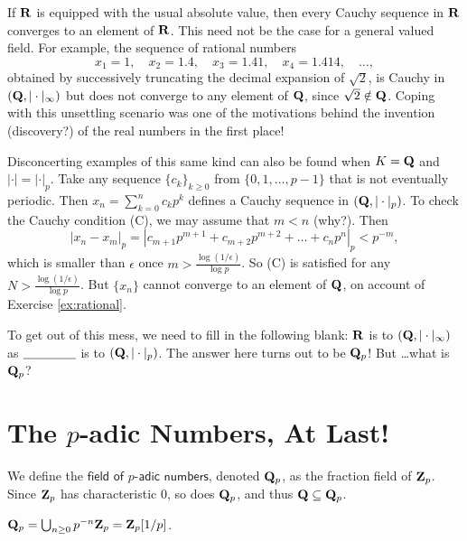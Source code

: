 \vspace{-0.22in}
\testrule 
If $\mathbf{R}$ is equipped with the usual absolute value, then every Cauchy sequence in $\mathbf{R}$ converges to an element of $\mathbf{R}$. This need not be the case for a general valued field. For example, the sequence of rational numbers
\[ x_1 =1, \quad x_2 = 1.4, \quad x_3 = 1.41, \quad x_4 = 1.414,\quad \dots, \]
obtained by successively truncating the decimal expansion of $\sqrt{2}$, is Cauchy in $(\mathbf{Q},|\cdot|_{\infty})$ but does not converge to any element of $\mathbf{Q}$, since $\sqrt{2}\notin \mathbf{Q}$. Coping with this unsettling scenario was one of the motivations behind the invention (discovery?) of the real numbers in the first place!

Disconcerting examples of this same kind can also be found when $K=\mathbf{Q}$ and $|\cdot| = |\cdot|_p$. Take any sequence $\{c_k\}_{k\ge 0}$ from $\{0,1,\dots,p-1\}$ that is not eventually periodic. Then $x_n = \sum_{k=0}^{n} c_k p^k$ defines a Cauchy sequence in $(\mathbf{Q},|\cdot|_p)$. To check the Cauchy condition (C), we may assume that $m < n$ (why?). Then  
\[ |x_n - x_m|_p = |c_{m+1} p^{m+1} + c_{m+2} p^{m+2} + \dots + c_n p^{n}|_p < p^{-m},\]
which is smaller than $\epsilon$ once $m > \frac{\log(1/\epsilon)}{\log{p}}$. So (C) is satisfied for any $N > \frac{\log(1/\epsilon)}{\log{p}}$. But $\{x_n\}$ cannot converge to an element of $\mathbf{Q}$, on account of Exercise \ref{ex:rational}.

To get out of this mess, we need to fill in the following blank: $\mathbf{R}$ is to $(\mathbf{Q},|\cdot|_{\infty})$ as $\underline{\hphantom{nonsense}}$ is to $(\mathbf{Q},|\cdot|_{p})$. The answer here turns out to be $\mathbf{Q}_p$! But \dots what is $\mathbf{Q}_p$?
\testruletwo

\section*{The $p$-adic Numbers, At Last!}

We define the $\textsf{field of $p$-adic numbers}$, denoted $\mathbf{Q}_p$,  as the fraction field of  $\mathbf{Z}_p$. Since $\mathbf{Z}_p$ has characteristic $0$, so does $\mathbf{Q}_p$, and thus $\mathbf{Q}\subseteq \mathbf{Q}_p$.

\begin{prob}\label{prob:63} $\mathbf{Q}_p = \bigcup_{n\ge 0} p^{-n} \mathbf{Z}_p =  \mathbf{Z}_p[1/p]$.
\end{prob}

